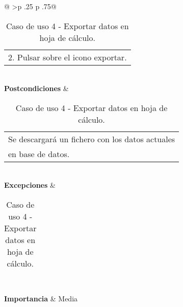 \begin{table}[h]
\begin{tabular}{@{}
			>{}p {.25\textwidth} p {.75\textwidth}@{}}
\begin{tabular}[c]{@{}l@{}}
										2. Pulsar sobre el icono exportar.
									\end{tabular} \\ \midrule
		\textbf{Postcondiciones} &  \begin{tabular}[c]{@{}l@{}}
										Se descargará un fichero con los datos actuales \\
										en base de datos.
									\end{tabular} \\ \midrule
		\textbf{Excepciones}     &  \begin{tabular}[c]{@{}l@{}}

									\end{tabular} \\ \midrule
		\textbf{Importancia}     &  Media \\ \bottomrule
	\end{tabular}
	\caption{Caso de uso 4 - Exportar datos en hoja de cálculo.}
\end{table}



